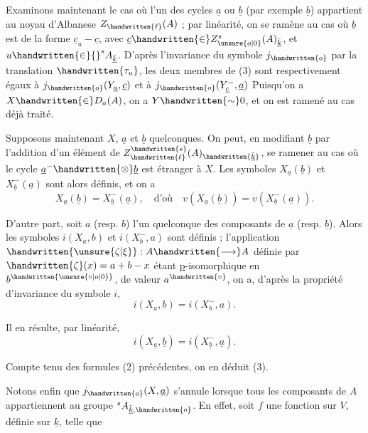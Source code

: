 
Examinons maintenant le cas où l'un des cycles $\underline{a}$ ou $\underline{b}$ (par exemple $\underline{b}$) appartient au noyau d'Albanese $Z_{\handwritten{\ell}}(A)$ ; par linéarité, on se ramène au cas où $\underline{b}$ est de la forme $\underline{c}_u-\underline{c}$, avec $\underline{c}\handwritten{\in}Z^{s}_{\unsure{o|0}}(A)_{\bar{\underline{k}}}$, et $u\handwritten{\in}{}^{s}A_{\bar{\underline{k}}}$. D'après l'invariance du symbole $j_{\handwritten{o}}$ par la translation $\handwritten{\tau_u}$, les deux membres de (3) sont respectivement égaux à $j_{\handwritten{o}}(Y_{\underline{a}},\underline{c})$ et à $j_{\handwritten{o}}(Y^{-}_{\underline{c}},\underline{a})$  Puisqu'on a $X\handwritten{\in}D_a(A)$, on a $Y\handwritten{\sim}0$, et on est ramené au cas déjà traité.

Supposons maintenant $X$, $\underline{a}$ et $\underline{b}$ quelconques. On peut, en modifiant $\underline{b}$ par l'addition d'un élément de $Z^{\handwritten{s}}_{\handwritten{\ell}}(A)_{\handwritten{\bar{\underline{k}}}}$, se ramener au cas où le cycle $\underline{a}^{-}\handwritten{\otimes}\underline{b}$ est étranger à $X$. Les symboles $X_{\underline{a}}(\underline{b})$ et $X^{-}_{\underline{b}}(\underline{a})$ sont alors définis, et on a
\[
X_{\underline{a}}(\underline{b})=X^{-}_{\underline{b}}(\underline{a}),\quad\text{d'où}\quad v(X_{\underline{a}}(\underline{b}))=v(X^{-}_{\underline{b}}(\underline{a})).
\]

D'autre part, soit $a$ (resp. $b$) l'un quelconque des composants de $\underline{a}$ (resp. $\underline{b}$). Alors les symboles $i(X_a,b)$ et $i(X^{-}_b,a)$ sont définis ; l'application $\handwritten{\unsure{\zeta|\xi}}:A\handwritten{\longrightarrow}A$ définie par $\handwritten{\zeta}(x)=a+b-x$ étant \uline{p}-isomorphique en $b^{\handwritten{\unsure{\circ|o|0}}}$, de valeur $a^{\handwritten{\circ}}$, on a, d'après la propriété d'invariance du symbole $i$,
\[
i(X_a,b)=i(X^{-}_b,a).
\]

Il en résulte, par linéarité,
\[
i(X_{\underline{a}},\underline{b})=i(X^{-}_{\underline{b}},\underline{a}).
\]

Compte tenu des formules (2) précédentes, on en déduit (3).

Notons enfin que $j_{\handwritten{o}}(X,\underline{a})$ s'annule lorsque tous les composants de $A$ appartiennent au groupe ${}^{s}A_{\bar{\underline{k}},\handwritten{o}}$. En effet, soit $f$ une fonction sur $V$, définie sur $\underline{k}$, telle que

